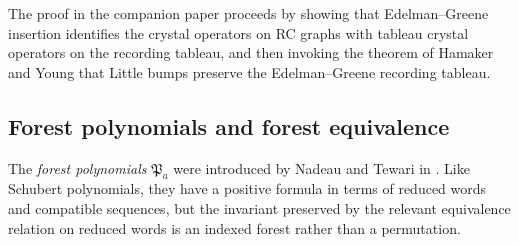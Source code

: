 \documentclass{amsart}
\theoremstyle{definition}
\theoremstyle{remark}
\numberwithin{equation}{subsection}
\newcommand{\forest}{\mathfrak{P}}
\begin{document}
The proof in the companion paper proceeds by showing that Edelman--Greene insertion identifies the crystal operators on RC graphs with tableau crystal operators on the recording tableau, and then invoking the theorem of Hamaker and Young \cite[Theorem~4.4]{hamaker2014relating} that Little bumps preserve the Edelman--Greene recording tableau.

\subsection{Forest polynomials and forest equivalence}\label{section:forestbackground}

The \emph{forest polynomials} $\forest_a$ were introduced by Nadeau and Tewari in \cite{nadeau2024forest}. Like Schubert polynomials, they have a positive formula in terms of reduced words and compatible sequences, but the invariant preserved by the relevant equivalence relation on reduced words is an indexed forest rather than a permutation.
\end{document}
